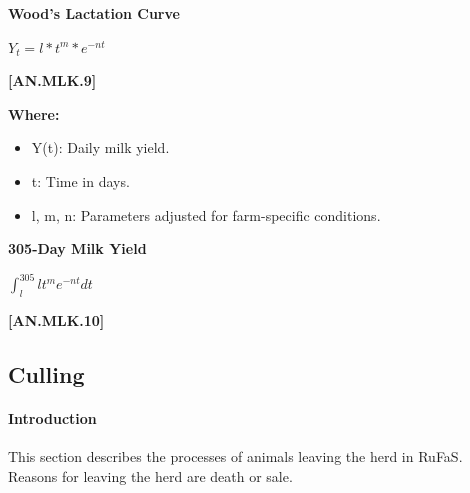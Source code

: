 \documentclass{article}
\begin{document}
\begin{refsection}
    \textbf{Wood's Lactation Curve}
    
            \begin{center}
                \(Y_t = l * t^{m} * e^{-nt}\)
            \end{center}
            \vspace{0.5cm}
            
            {\raggedleft \textbf{[AN.MLK.9]}\par}
            \vspace{0.5cm}

        \textbf{Where:}
        \vspace{0.2cm}
        
        \begin{itemize}
            \item Y(t): Daily milk yield.
            \item t: Time in days.
            \item l, m, n: Parameters adjusted for farm-specific conditions.
        \end{itemize}
    \vspace{0.5cm}

    \textbf{305-Day Milk Yield}
    
            \begin{center}
                \(\int_{l}^{305} lt^me^{-nt}dt\)
            \end{center}
            \vspace{0.5cm}
            
            {\raggedleft \textbf{[AN.MLK.10]}\par}
            \vspace{0.5cm}


\subsection{Culling} \label{herdexit} 

 
\paragraph{Introduction} This section describes the processes of animals leaving the herd in RuFaS. 
Reasons for leaving the herd are death or sale. 
\vspace{0.5cm}


\end{refsection}
\end{document}

